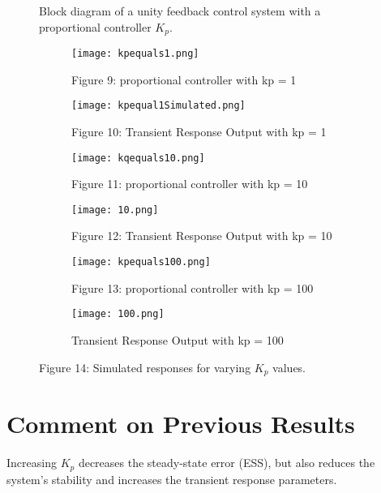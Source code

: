 \documentclass{report}
\begin{document}
\begin{flushleft}
\begin{figure}[H]
\vspace{0.5em}
\caption{Block diagram of a unity feedback control system with a proportional controller \(K_p\).}

\vspace{1.5em}

\begin{subfigure}[b]{0.45\textwidth}
    \centering
    \texttt{[image: kpequals1.png]}
    \caption{Figure 9: proportional controller with kp = 1}
\end{subfigure}
\hfill
\begin{subfigure}[b]{0.45\textwidth}
    \centering
    \texttt{[image: kpequal1Simulated.png]}
    \caption{Figure 10: Transient Response Output with kp = 1}
\end{subfigure}

\vspace{1em}

\begin{subfigure}[b]{0.45\textwidth}
    \centering
    \texttt{[image: kqequals10.png]}
    \caption{Figure 11: proportional controller with kp = 10}
\end{subfigure}
\hfill
\begin{subfigure}[b]{0.45\textwidth}
    \centering
    \texttt{[image: 10.png]}
    \caption{Figure 12: Transient Response Output with kp = 10}
\end{subfigure}

\vspace{1em}

\begin{subfigure}[b]{0.45\textwidth}
    \centering
    \texttt{[image: kpequals100.png]}
    \caption{Figure 13: proportional controller with kp = 100}
\end{subfigure}
\hfill
\begin{subfigure}[b]{0.45\textwidth}
    \centering
    \texttt{[image: 100.png]}
    \caption{Transient Response Output with kp = 100}
\end{subfigure}

\caption*{Figure 14: Simulated responses for varying \(K_p\) values.}

\end{figure}

\newpage
\section*{Comment on Previous Results}
Increasing \( K_p \) decreases the steady-state error (ESS), but also reduces the system's stability and increases the transient response parameters.


\end{flushleft}
\end{document}
